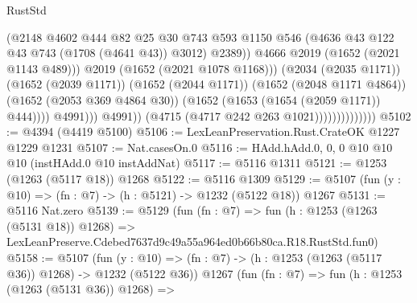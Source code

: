 \begin{lexlean}{RustStd}
\begin{coremodule}
                                                (@2148
                                                  @4602
                                                  @444
                                                  @82
                                                  @25
                                                  @30
                                                  @743
                                                  @593
                                                  @1150
                                                  @546
                                                  (@4636
                                                    @43
                                                    @122
                                                    @43
                                                    @743
                                                    (@1708 (@4641 @43))
                                                    @3012)
                                                  @2389))
                                              @4666
                                              @2019
                                              (@1652 (@2021 @1143 @489)))
                                            @2019
                                            (@1652 (@2021 @1078 @1168)))
                                          (@2034 (@2035 @1171))
                                          (@1652 (@2039 @1171))
                                          (@1652 (@2044 @1171))
                                          (@1652 (@2048 @1171 @4864))
                                          (@1652 (@2053 @369 @4864 @30))
                                          (@1652 (@1653 (@1654 (@2059 @1171)) @444))))
                                      @4991)))
                                @4991))
                            (@4715 (@4717 @242 @263 @1021))))))))))))))
@5102 := @4394 (@4419 @5100)
@5106 := LexLeanPreservation.Rust.CrateOK @1227 @1229 @1231
@5107 := Nat.casesOn.{0}
@5116 := HAdd.hAdd.{0, 0, 0} @10 @10 @10 (instHAdd.{0} @10 instAddNat)
@5117 := @5116 @1311
@5121 := @1253 (@1263 (@5117 @18)) @1268
@5122 := @5116 @1309
@5129 := @5107 (fun (y : @10) => (fn : @7) -> (h : @5121) -> @1232 (@5122 @18)) @1267
@5131 := @5116 Nat.zero
@5139 := @5129
    (fun (fn : @7) =>
    fun (h : @1253 (@1263 (@5131 @18)) @1268) =>
    LexLeanPreserve.Cdebed7637d9c49a55a964ed0b66b80ca.R18.RustStd.fun0)
@5158 := @5107
    (fun (y : @10) => (fn : @7) -> (h : @1253 (@1263 (@5117 @36)) @1268) -> @1232 (@5122 @36))
    @1267
    (fun (fn : @7) =>
    fun (h : @1253 (@1263 (@5131 @36)) @1268) =>

\end{coremodule}
\end{lexlean}
